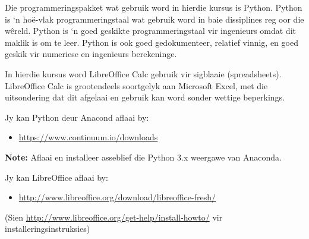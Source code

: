         Die programmeringspakket wat gebruik word in hierdie kursus is Python.
        Python is `n ho\"{e}-vlak programmeringstaal wat gebruik word in baie
        dissiplines reg oor die w\^{e}reld. Python is `n goed geskikte
        programmeringstaal vir ingenieurs omdat dit maklik is om te leer.
        Python is ook goed gedokumenteer, relatief vinnig, en goed geskik vir
        numeriese en ingenieurs berekeninge.

        In hierdie kursus word LibreOffice Calc gebruik vir sigblaaie
        (spreadsheets). LibreOffice Calc is grootendeels soortgelyk aan
        Microsoft Excel, met die uitsondering dat dit afgelaai en gebruik kan
        word sonder wettige beperkings.

        \noindent
        Jy kan Python deur Anacond aflaai by:
        \begin{itemize}
            \item \url{https://www.continuum.io/downloads}
        \end{itemize}
        \textbf{Note:} Aflaai en installeer asseblief die Python 3.x weergawe
        van Anaconda.

        \noindent
        Jy kan LibreOffice aflaai by:
        \begin{itemize}
            \item \url{http://www.libreoffice.org/download/libreoffice-fresh/}
        \end{itemize}
        (Sien \url{http://www.libreoffice.org/get-help/install-howto/} vir
        installeringsinstruksies)
